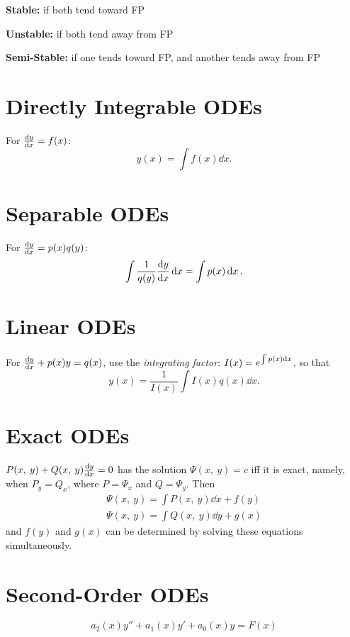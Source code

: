 \documentclass{article}
\begin{document}
\begin{multicols}{3}
    \textbf{Stable:} if both tend toward FP

    \textbf{Unstable:} if both tend away from FP

    \textbf{Semi-Stable:} if one tends toward FP, and another tends away from FP
    \section*{Directly Integrable ODEs}
    For \(\dv{y}{x} = f(x)\):
    \begin{equation*}
        y(x) = \int f(x) \dd{x}.
    \end{equation*}
    \section*{Separable ODEs}
    For \(\dv{y}{x} = p(x) q(y)\):
    \begin{equation*}
        \int \frac{1}{q(y)} \dv{y}{x} \dd{x} = \int p(x) \dd{x}.
    \end{equation*}
    \section*{Linear ODEs}
    For \(\dv{y}{x} + p(x)y = q(x)\), use the \textit{integrating factor}:
    \(I(x) = e^{\int p(x) \dd{x}}\), so that
    \begin{equation*}
        y(x) = \frac{1}{I(x)} \int I(x) q(x) \dd{x}.
    \end{equation*}
    \section*{Exact ODEs}
    \(P(x,\: y) + Q(x,\: y)\dv{y}{x} = 0\)
    has the solution
    \(\Psi(x,\: y) = c\)
    iff it is exact, namely, when
    \(P_y = Q_x\),
    where \(P = \Psi_x\) and \(Q = \Psi_y\). Then
    \begin{gather*}
        \Psi(x,\: y) = \int P(x,\: y) \dd{x} + f(y) \\
        \Psi(x,\: y) = \int Q(x,\: y) \dd{y} + g(x)
    \end{gather*}
    and \(f(y)\) and \(g(x)\) can be determined by solving these equations simultaneously.
    \section*{Second-Order ODEs}
    \begin{equation*}
        a_2(x)y'' + a_1(x)y' + a_0(x)y = F(x)
    \end{equation*}

\end{multicols}
\end{document}
